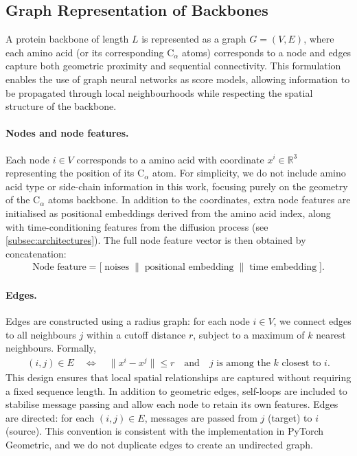 \documentclass[a4paper,12pt]{article}
\begin{document}
\subsection{Graph Representation of Backbones}\label{subsec:graph-repr}
A protein backbone  of length \(L\) is represented as a graph \(G=(V,E)\), where each amino acid (or its corresponding C\(_\alpha\) atoms) corresponds to a node and edges capture both geometric proximity and sequential connectivity. This formulation enables the use of graph neural networks as score models, allowing information to be propagated through local neighbourhoods while respecting the spatial structure of the backbone. 

\paragraph{Nodes and node features.}
Each node \(i \in V\) corresponds to a amino acid with coordinate \(x^i \in \mathbb{R}^3\) representing the position of its C\(_\alpha\) atom. For simplicity, we do not include amino acid type or side-chain information in this work, focusing purely on the geometry of the C\(_\alpha\) atoms backbone. In addition to the coordinates, extra node features are initialised as positional embeddings derived from the amino acid index, along with time-conditioning features from the diffusion process (see \cref{subsec:architectures}). The full node feature vector is then obtained by concatenation:
\begin{align*}
    \text{Node feature} = \big[ \; \text{noises} \;\|\; \text{positional embedding} \;\|\; \text{time embedding} \;\big].
\end{align*}

\paragraph{Edges.}
Edges are constructed using a radius graph: for each node \(i\in V\), we connect edges to all neighbours \(j\) within a cutoff distance \(r\), subject to a maximum of \(k\) nearest neighbours. Formally,
\begin{align*}
    (i,j) \in E \quad \Leftrightarrow \quad \|x^i - x^j\| \leq r \quad \text{and}\quad j \text{ is among the } k \text{ closest to } i.
\end{align*}
This design ensures that local spatial relationships are captured without requiring a fixed sequence length. In addition to geometric edges, self-loops are included to stabilise message passing and allow each node to retain its own features. Edges are directed: for each \((i,j) \in E\), messages are passed from \(j\) (target) to \(i\) (source). This convention is consistent with the implementation in PyTorch Geometric, and we do not duplicate edges to create an undirected graph.
\end{document}
